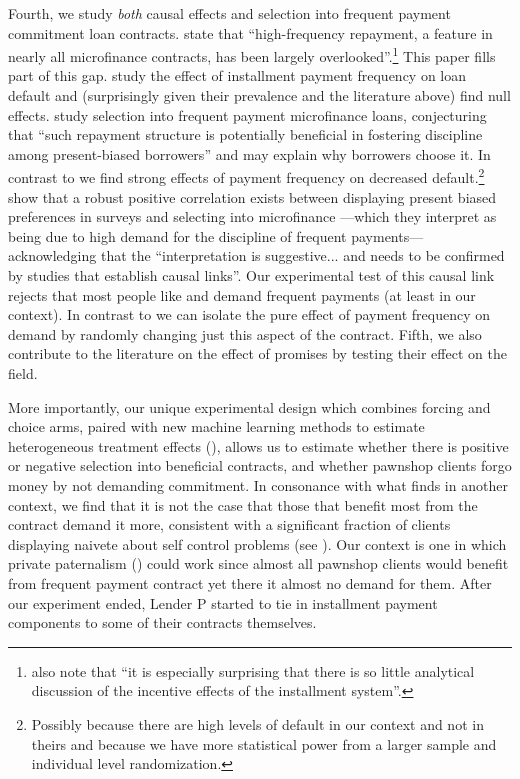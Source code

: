 \documentclass[11pt]{article}
\begin{document}
Fourth, we study \textit{both} causal effects and selection into frequent payment commitment loan contracts. \cite{Ghatak} state that ``high-frequency repayment, a feature in nearly all microfinance contracts, has been largely overlooked''.\footnote{\cite{LittleAtAtime} also note that ``it is especially surprising that there is so little analytical discussion of the incentive effects of the installment system''.} This paper fills part of this gap. \cite{Pande} study the effect of installment payment frequency on loan default and (surprisingly given their prevalence and the literature above) find null effects. \cite{Murdoch} study selection into frequent payment microfinance loans, conjecturing that ``such repayment structure is potentially beneficial in fostering discipline among present-biased borrowers'' and may explain why borrowers choose it. In contrast to \cite{Pande} we find strong effects of payment frequency on decreased default.\footnote{Possibly because there are high levels of default in our context and not in theirs and because we have more statistical power from a larger sample and individual level randomization.} \cite{Murdoch}  show that a robust positive correlation exists between displaying present biased preferences in surveys and selecting into microfinance ---which they interpret as being due to high demand for the discipline of frequent payments--- acknowledging that the ``interpretation is suggestive... and needs to be confirmed by studies that establish causal links''. Our experimental test of this causal link rejects that most people like and demand frequent payments (at least in our context). In contrast to \cite{Murdoch} we can isolate the pure effect of payment frequency on demand by randomly changing just this aspect of the contract. Fifth, we also contribute to the literature on the effect of promises by testing their effect on the field. 

More importantly, our unique experimental design which combines forcing and choice arms, paired with new machine learning methods to estimate heterogeneous treatment effects (\cite{atheygrf}), allows us to estimate whether there is positive or negative selection into beneficial contracts, and whether pawnshop clients forgo money by not demanding commitment. In consonance with what \cite{Walters} finds in another context, we find that it is not the case that those that benefit most from the contract demand it more, consistent with a significant fraction of clients displaying naivete about self control problems (see \cite{Rabin2018}). Our context is one in which private paternalism (\cite{Laibson2018}) could work since almost all pawnshop clients would benefit from frequent payment contract yet there it almost no demand for them. After our experiment ended, Lender P started to tie in installment payment components to some of their contracts themselves.
\end{document}

